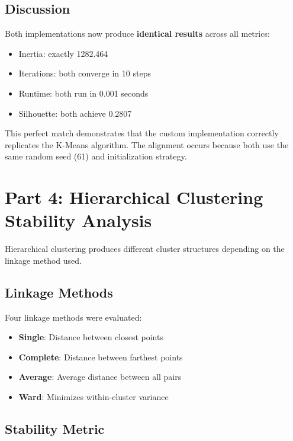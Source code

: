 \documentclass[12pt,a4paper]{article}
\begin{document}
\subsection{Discussion}

Both implementations now produce \textbf{identical results} across all metrics:
\begin{itemize}
    \item Inertia: exactly 1282.464
    \item Iterations: both converge in 10 steps
    \item Runtime: both run in 0.001 seconds
    \item Silhouette: both achieve 0.2807
\end{itemize}

This perfect match demonstrates that the custom implementation correctly replicates the K-Means algorithm. The alignment occurs because both use the same random seed (61) and initialization strategy.

\section{Part 4: Hierarchical Clustering Stability Analysis}

Hierarchical clustering produces different cluster structures depending on the linkage method used.

\subsection{Linkage Methods}

Four linkage methods were evaluated:
\begin{itemize}
    \item \textbf{Single}: Distance between closest points
    \item \textbf{Complete}: Distance between farthest points
    \item \textbf{Average}: Average distance between all pairs
    \item \textbf{Ward}: Minimizes within-cluster variance
\end{itemize}

\subsection{Stability Metric}
\end{document}

